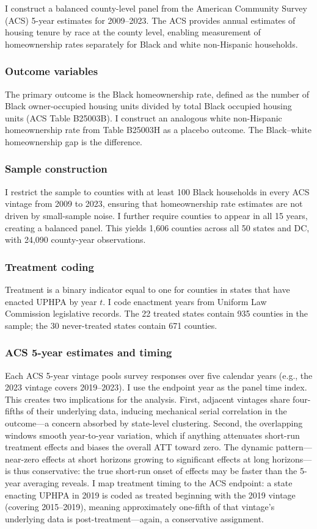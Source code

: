 \documentclass[12pt]{article}
\begin{document}
I construct a balanced county-level panel from the American Community Survey (ACS) 5-year estimates for 2009--2023. The ACS provides annual estimates of housing tenure by race at the county level, enabling measurement of homeownership rates separately for Black and white non-Hispanic households.

\subsubsection*{Outcome variables} The primary outcome is the Black homeownership rate, defined as the number of Black owner-occupied housing units divided by total Black occupied housing units (ACS Table B25003B). I construct an analogous white non-Hispanic homeownership rate from Table B25003H as a placebo outcome. The Black--white homeownership gap is the difference.

\subsubsection*{Sample construction} I restrict the sample to counties with at least 100 Black households in every ACS vintage from 2009 to 2023, ensuring that homeownership rate estimates are not driven by small-sample noise. I further require counties to appear in all 15 years, creating a balanced panel. This yields 1,606 counties across all 50 states and DC, with 24,090 county-year observations.

\subsubsection*{Treatment coding} Treatment is a binary indicator equal to one for counties in states that have enacted UPHPA by year $t$. I code enactment years from Uniform Law Commission legislative records. The 22 treated states contain 935 counties in the sample; the 30 never-treated states contain 671 counties.

\subsubsection*{ACS 5-year estimates and timing} Each ACS 5-year vintage pools survey responses over five calendar years (e.g., the 2023 vintage covers 2019--2023). I use the endpoint year as the panel time index. This creates two implications for the analysis. First, adjacent vintages share four-fifths of their underlying data, inducing mechanical serial correlation in the outcome---a concern absorbed by state-level clustering. Second, the overlapping windows smooth year-to-year variation, which if anything attenuates short-run treatment effects and biases the overall ATT toward zero. The dynamic pattern---near-zero effects at short horizons growing to significant effects at long horizons---is thus conservative: the true short-run onset of effects may be faster than the 5-year averaging reveals. I map treatment timing to the ACS endpoint: a state enacting UPHPA in 2019 is coded as treated beginning with the 2019 vintage (covering 2015--2019), meaning approximately one-fifth of that vintage's underlying data is post-treatment---again, a conservative assignment.
\end{document}
